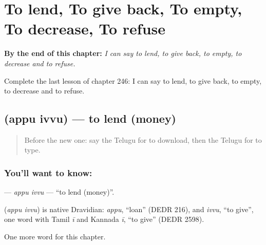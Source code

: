 
\chapter{To lend, To give back, To empty, To decrease, To refuse}
\label{ch:te-to-lend-to-give-back-to-empty-to-decrease-to-refuse}

\begin{chapteropening}
\textbf{By the end of this chapter:} \emph{I can say to lend, to give back, to empty, to decrease and to refuse.}

Complete the last lesson of chapter 246: I can say to lend, to give back, to empty, to decrease and to refuse.
\end{chapteropening}

\section[\texorpdfstring{\te{అప్పు} \te{ఇవ్వు} (appu ivvu)}{అప్పు ఇవ్వు (appu ivvu)}]{  (appu ivvu) — to lend (money)}

\label{lesson:TE-C246-appu-ivvu}



\begin{quote}
Before the new one: say the Telugu for to download, then the Telugu for to type.
\end{quote}

\subsection*{You'll want to know:  }
\textbf{ } — \emph{appu ivvu} — \textquotedblleft{}to lend (money)\textquotedblright{}.

\begin{cousinweb}
\textbf{ } (\emph{appu ivvu}) is native Dravidian: \emph{appu}, \textquotedblleft{}loan\textquotedblright{} (DEDR 216), and \emph{ivvu}, \textquotedblleft{}to give\textquotedblright{}, one word with Tamil \emph{ī} and Kannada \emph{ī}, \textquotedblleft{}to give\textquotedblright{} (DEDR 2598).
\end{cousinweb}

\begin{grammarlens}[title={What you've built}]
One more word for this chapter.
\end{grammarlens}

